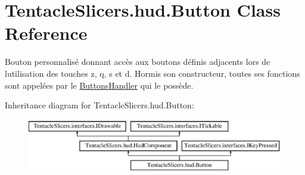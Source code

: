 \hypertarget{class_tentacle_slicers_1_1hud_1_1_button}{}\section{Tentacle\+Slicers.\+hud.\+Button Class Reference}
\label{class_tentacle_slicers_1_1hud_1_1_button}


Bouton personnalisé donnant accès aux boutons définis adjacents lors de l\textquotesingle{}utilisation des touches z, q, s et d. Hormis son constructeur, toutes ses fonctions sont appelées par le \hyperlink{class_tentacle_slicers_1_1hud_1_1_buttons_handler}{Buttons\+Handler} qui le possède.  


Inheritance diagram for Tentacle\+Slicers.\+hud.\+Button\+:\begin{figure}[H]
\begin{center}
\leavevmode
\includegraphics[height=2.314050cm]{class_tentacle_slicers_1_1hud_1_1_button}
\end{center}
\end{figure}
